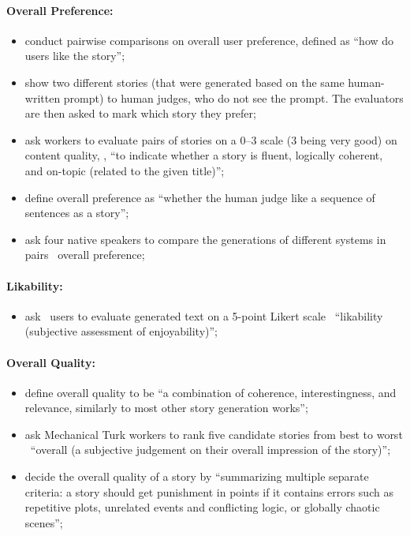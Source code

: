 \paragraph{Overall Preference:}
\begin{itemize}[nolistsep]
    \item \citet{yao2019plan} conduct pairwise comparisons on overall user preference, defined as ``how do users like the story'';
    \item \citet{fan-etal-2019-strategies} show two different stories (that were generated based on the same human-written prompt) to human judges, who do not see the prompt. The evaluators are then asked to mark which story they prefer;
    \item \citet{brahman2020modeling} ask workers to evaluate pairs of stories on a 0--3 scale (3 being very good) on content quality, \ie, ``to indicate whether a story is fluent, logically coherent, and on-topic (related to the given title)'';
    \item \citet{wang2020narrative} define overall preference as ``whether the human judge like a sequence of sentences as a story'';
    \item \citet{bai2021semantics} ask four native speakers to compare the generations of different systems in pairs \wrt\ overall preference;
\end{itemize}

\paragraph{Likability:}
\begin{itemize}[nolistsep]
    \item \citet{akoury2020storium} ask \storium\ users to evaluate generated text on a 5-point Likert scale \wrt\ ``likability (subjective assessment of enjoyability)'';
\end{itemize}

\paragraph{Overall Quality:}
\begin{itemize}[nolistsep]
    \item \citet{goldfarb-tarrant-etal-2020-content} define overall quality to be ``a combination of coherence, interestingness, and relevance, similarly to most other story generation works'';
    \item \citet{wilmot2021temporal} ask Mechanical Turk workers to rank five candidate stories from best to worst \wrt\ ``overall (a subjective judgement on their overall impression of the story)'';
    \item \citet{guan2021openmeva} decide the overall quality of a story by ``summarizing multiple separate criteria: a story should get punishment in points if it contains errors such as repetitive plots, unrelated events and conflicting logic, or globally chaotic scenes'';
\end{itemize}

